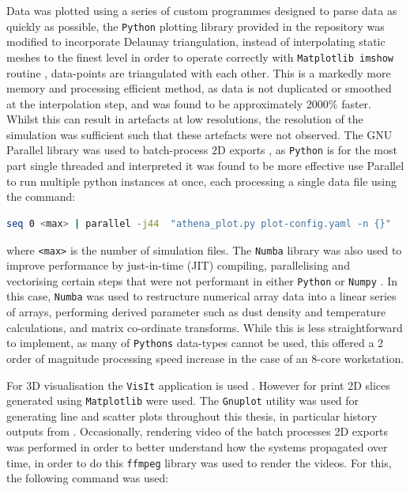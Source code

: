 Data was plotted using a series of custom programmes designed to parse data as quickly as possible, 
the \texttt{Python} plotting library provided in the \athena{} repository was modified to incorporate Delaunay triangulation, instead of interpolating static meshes to the finest level in order to operate correctly with \texttt{Matplotlib imshow} routine \parencite{Hunter:2007}, data-points are triangulated with each other.
This is a markedly more memory and processing efficient method, as data is not duplicated or smoothed at the interpolation step, and was found to be approximately 2000\% faster.
Whilst this can result in artefacts at low resolutions, the resolution of the simulation was sufficient such that these artefacts were not observed.
The GNU Parallel library was used to batch-process 2D exports \parencite{tange_2021_5523272}, as \texttt{Python} is for the most part single threaded and interpreted it was found to be more effective use Parallel to run multiple python instances at once, each processing a single data file using the command:

\begin{lstlisting}[language=bash]
seq 0 <max> | parallel -j44  "athena_plot.py plot-config.yaml -n {}"
\end{lstlisting}

\noindent
where \texttt{<max>} is the number of simulation files.
The \texttt{Numba} library \parencite{lam2015numba} was also used to improve performance by just-in-time (JIT) compiling, parallelising and vectorising certain steps that were not performant in either \texttt{Python} or \texttt{Numpy} \parencite{harris2020array}.
In this case, \texttt{Numba} was used to restructure numerical array data into a linear series of arrays, performing derived parameter such as dust density and temperature calculations, and matrix co-ordinate transforms.
While this is less straightforward to implement, as many of \texttt{Pythons} data-types cannot be used, this offered a 2 order of magnitude processing speed increase in the case of an 8-core workstation.

For 3D visualisation the \texttt{VisIt} application is used \parencite{HPV:VisIt}.
However for print 2D slices generated using \texttt{Matplotlib} were used. 
The \texttt{Gnuplot} utility \parencite{gnuplot} was used for generating line and scatter plots throughout this thesis, in particular history outputs from \athena{}.
Occasionally, rendering video of the batch processes 2D exports was performed in order to better understand how the systems propagated over time, in order to do this \texttt{ffmpeg} library \parencite{tomar2006converting} was used to render the videos.
For this, the following command was used:

